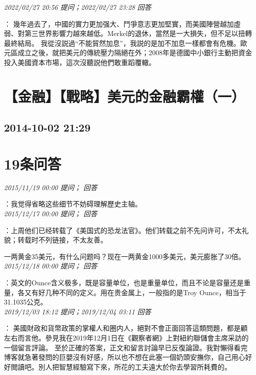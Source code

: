 \documentclass[twocolumn]{ctexart}
\begin{document}
\textit{\hfill\noindent\small 2022/02/27 20:56 提问；2022/02/27 23:28 回答}

：
幾年過去了，中國的實力更加强大、鬥爭意志更加堅實，而美國陣營越加虛弱、對第三世界影響力越來越低。Merkel的退休，當然是一大損失，但不足以扭轉最終結局。
我從沒説過“不能貿然加息”，我説的是加不加息一樣都會有危機。歐元區成立之後，就把美元的傳統壓力隔絕在外；2008年是德國中小銀行主動把資金投入美國資本市場，這次沒聽説他們敢重蹈覆轍。
\\


\section{【金融】【戰略】美元的金融霸權（一）}
\subsection{2014-10-02 21:29}


\section{19条问答}

\textit{\hfill\noindent\small 2015/11/19 00:00 提问； 回答}

：我觉得省略这些细节不妨碍理解歷史主轴。\\

\textit{\hfill\noindent\small 2015/12/17 00:00 提问； 回答}

：上周他们已经转载了《美国式的恐龙法官》。他们转载之前不先问许可，不太礼貌；转载时不列链接，不太友善。

一两黄金35美元，有什么问题吗？现在一两黄金1000多美元，美元膨胀了30倍。\\

\textit{\hfill\noindent\small 2015/12/18 00:00 提问； 回答}

：英文的Ounce含义极多，既是容量单位，也是重量单位，而且不论是容量还是重量，各又有好几种不同的定义。用在贵金属上，一般指的是Troy Ounce，相当于31.1035公克。\\

\textit{\hfill\noindent\small 2019/12/03 18:12 提问；2019/12/04 03:11 回答}

：
美國財政和貨幣政策的掌權人和圈内人，絕對不會正面回答這類問題，都是顧左右而言他。參見我在2019年12月1日在《觀察者網》上對紐約聯儲會主席采訪的一個留言評論。
至於正確的答案，正文和留言討論早已反復論證。我對懶得看完博客就急著發問的巨嬰沒有好感，所以也不想在此塞一個奶頭安撫你，自己用心好好閲讀吧。別人把智慧經驗寫下來，所花的工夫遠大於你去學習所耗費的。
\\
\end{document}
